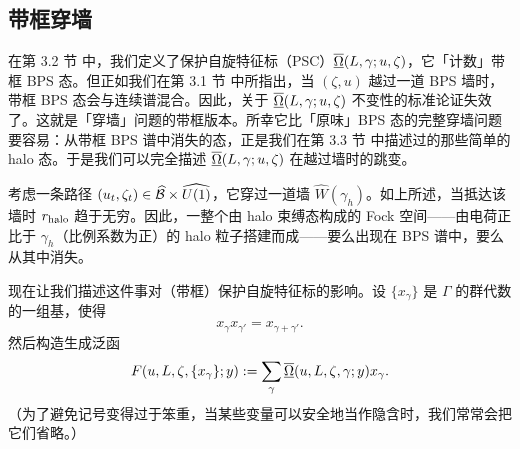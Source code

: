 
\subsection{带框穿墙}\label{subsec:Halo-Wall-Crossing}

在第 3.2 节%
中，我们定义了保护自旋特征标（PSC）$\overline{\underline{\Omega}}(L,\gamma;u,\zeta)$，它「计数」带框 BPS 态。但正如我们在第 3.1 节%
中所指出，当 $(\zeta,u)$ 越过一道 BPS 墙时，带框 BPS 态会与连续谱混合。因此，关于 $\overline{\underline{\Omega}}(L,\gamma;u,\zeta)$ 不变性的标准论证失效了。这就是「穿墙」问题的带框版本。所幸它比「原味」BPS 态的完整穿墙问题要容易：从带框 BPS 谱中消失的态，正是我们在第 3.3 节%
中描述过的那些简单的 halo 态。于是我们可以完全描述 $\overline{\underline{\Omega}}(L,\gamma;u,\zeta)$ 在越过墙时的跳变。

考虑一条路径 $(u_t,\zeta_t)\in\widehat{\mathcal{B}}\times\widehat{U(1)}$，它穿过一道墙 $\widehat{W}(\gamma_h)$。如上所述，当抵达该墙时 $r_{\rm halo}$ 趋于无穷。因此，一整个由 halo 束缚态构成的 Fock 空间——由电荷正比于 $\gamma_h$（比例系数为正）的 halo 粒子搭建而成——要么出现在 BPS 谱中，要么从其中消失。

现在让我们描述这件事对（带框）保护自旋特征标的影响。设 $\{x_\gamma\}$ 是 $\Gamma$ 的群代数的一组基，使得
\begin{equation} \label{eq:untwisted}
x_{\gamma} x_{\gamma'} = x_{\gamma +
\gamma'}.
\end{equation}
然后构造生成泛函
\begin{equation}\label{eq:gen}
F(u, L, \zeta, \{x_\gamma\}; y) := \sum_{\gamma} \overline{\underline{\Omega}}(u, L, \zeta,
\gamma; y) x_\gamma.
\end{equation}
（为了避免记号变得过于笨重，当某些变量可以安全地当作隐含时，我们常常会把它们省略。）

